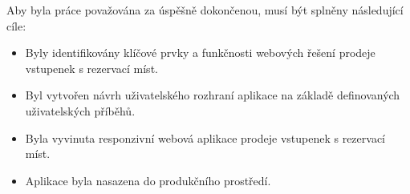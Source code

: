 Aby byla práce považována za úspěšně dokončenou, musí být splněny následující cíle:

\begin{itemize}
    \item Byly identifikovány klíčové prvky a funkčnosti webových řešení prodeje vstupenek s rezervací míst.
    \item Byl vytvořen návrh uživatelského rozhraní aplikace na základě definovaných uživatelských příběhů.
    \item Byla vyvinuta responzivní webová aplikace prodeje vstupenek s rezervací míst.
    \item Aplikace byla nasazena do produkčního prostředí.
\end{itemize}
